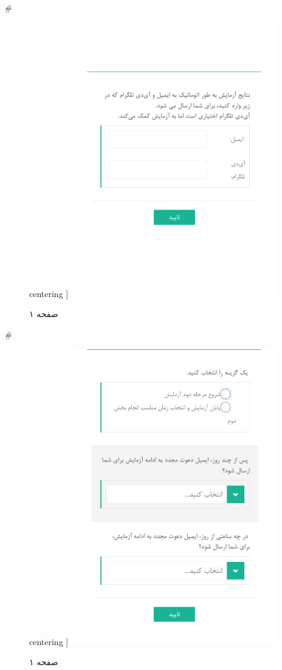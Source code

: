{ 
 # 
\begin{figure}[htpb]
centering ]
\includegraphics[width=0.8\textwidth]{./img/Task38.png/}
\caption{صفحه ۱}
\label{fig:Task1}
\end{figure}
 
 
 # 
\begin{figure}[htpb]
centering ]
\includegraphics[width=0.8\textwidth]{./img/Task39.png/}
\caption{صفحه ۱}
\label{fig:Task1}
\end{figure}
 
}
